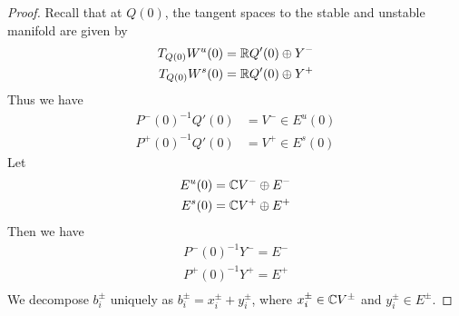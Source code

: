 \documentclass[thesis.tex]{subfiles}
\begin{document}
\begin{lemma}
\begin{proof}
Recall that at $Q(0)$, the tangent spaces to the stable and unstable manifold are given by
\begin{align*}
T_{Q(0)} W^u(0) &= \mathbb{R} Q'(0) \oplus Y^- \\
T_{Q(0)} W^s(0) &= \mathbb{R} Q'(0) \oplus Y^+
\end{align*}
Thus we have
\begin{align*}
P^-(0)^{-1} Q'(0) &= V^- \in E^u(0) \\
P^+(0)^{-1} Q'(0) &= V^+ \in E^s(0)
\end{align*}
Let
\begin{align*}
E^u(0) &= \mathbb{C} V^- \oplus E^- \\
E^s(0) &= \mathbb{C} V^+ \oplus E^+ \\
\end{align*}
Then we have
\begin{align*}
P^-(0)^{-1} Y^- = E^- \\
P^+(0)^{-1} Y^+ = E^+ \\
\end{align*}
We decompose $b_i^\pm$ uniquely as $b_i^\pm = x_i^\pm + y_i^\pm$, where $x_i^\pm \in \mathbb{C} V^\pm$ and $y_i^\pm \in E^\pm$.


\end{proof}
\end{lemma}
\end{document}
